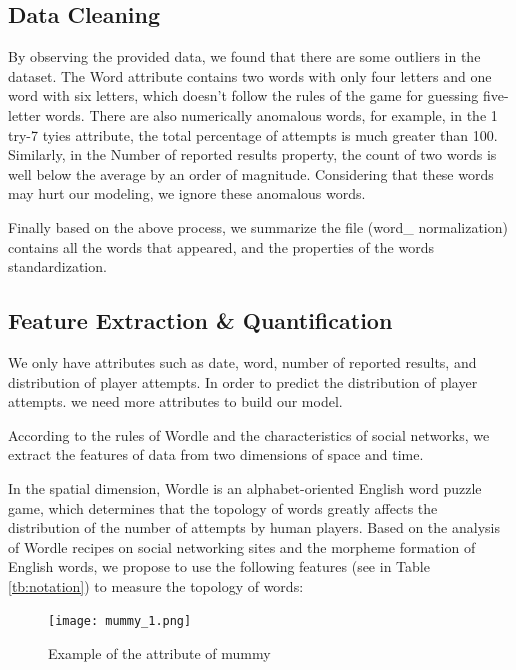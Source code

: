 \documentclass[12pt]{article}  %
\begin{document}
\subsection{Data Cleaning}
By observing the provided data, we found that there are some outliers in the dataset. The Word attribute contains two words with only four letters and one word with six letters, which doesn't follow the rules of the game for guessing five-letter words. There are also numerically anomalous words, for example, in the 1 try-7 tyies attribute, the total percentage of attempts is much greater than 100. Similarly, in the Number of reported results property, the count of two words is well below the average by an order of magnitude. Considering that these words may hurt our modeling, we ignore these anomalous words. 

Finally based on the above process, we summarize the file (word\_ normalization) contains all the words that appeared, and the properties of the words standardization.


\subsection{Feature Extraction \& Quantification}
We only have attributes such as date, word, number of reported results, and distribution of player attempts. In order to predict the distribution of player attempts. we need more attributes to build our model.

According to the rules of Wordle and the characteristics of social networks, we extract the features of data from two dimensions of space and time.

In the spatial dimension, Wordle is an alphabet-oriented English word puzzle game, which determines that the topology of words greatly affects the distribution of the number of attempts by human players. Based on the analysis of Wordle recipes on social networking sites and the morpheme formation of English words, we propose to use the following features (see in Table \ref{tb:notation}) to measure the topology of words:
\begin{figure}[htbp]
    \centering
    \texttt{[image: mummy\_1.png]}
    \caption{Example of the attribute of mummy}\label{fig:mummy_1}
\end{figure}

\end{document}

